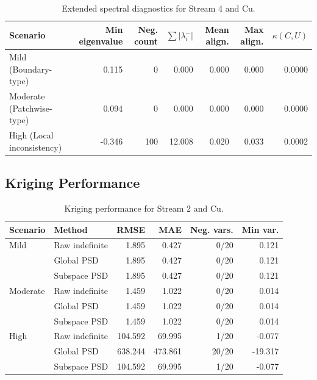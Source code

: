\documentclass[smallextended]{svjour3}
\newcommand{\1}{\mathbf{1}}
\begin{document}
\begin{table}[htbp]
	\centering
	\caption{Extended spectral diagnostics for Stream 4 and Cu.}
	\label{tab:extended_eigen_stream_4_Cu}
	\begin{tabular}{lrrrrrr}
		\hline
		Scenario & Min eigenvalue & Neg. count & $\sum |\lambda_i^-|$ & Mean align. & Max align. & $\kappa(C,U)$ \\
		\hline
		Mild (Boundary-type) & 0.115 & 0 & 0.000 & 0.000 & 0.000 & 0.0000 \\
		Moderate (Patchwise-type) & 0.094 & 0 & 0.000 & 0.000 & 0.000 & 0.0000 \\
		High (Local inconsistency) & -0.346 & 100 & 12.008 & 0.020 & 0.033 & 0.0002 \\
		\hline
	\end{tabular}
\end{table}

\clearpage
\subsection*{Kriging Performance}

\begin{table}[htbp]
	\centering
	\caption{Kriging performance for Stream 2 and Cu.}
	\label{tab:performance_stream_2_Cu}
	\begin{tabular}{llrrrr}
		\hline
		Scenario & Method & RMSE & MAE & Neg. vars. & Min var. \\
		\hline
		Mild & Raw indefinite & 1.895 & 0.427 & 0/20 & 0.121 \\
		& Global PSD & 1.895 & 0.427 & 0/20 & 0.121 \\
		& Subspace PSD & 1.895 & 0.427 & 0/20 & 0.121 \\
		\hline
		Moderate & Raw indefinite & 1.459 & 1.022 & 0/20 & 0.014 \\
		& Global PSD & 1.459 & 1.022 & 0/20 & 0.014 \\
		& Subspace PSD & 1.459 & 1.022 & 0/20 & 0.014 \\
		\hline
		High & Raw indefinite & 104.592 & 69.995 & 1/20 & -0.077 \\
		& Global PSD & 638.244 & 473.861 & 20/20 & -19.317 \\
		& Subspace PSD & 104.592 & 69.995 & 1/20 & -0.077 \\
		\hline
	\end{tabular}
\end{table}
\end{document}
